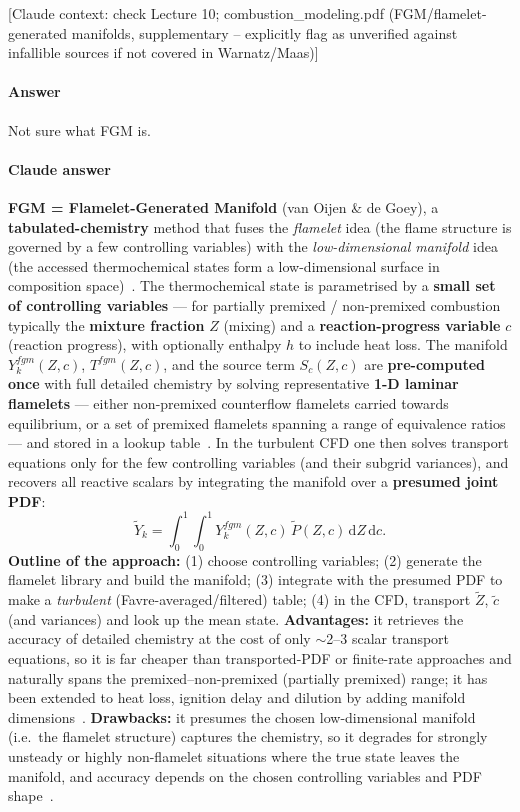 {\color{gray}\footnotesize [Claude context: check Lecture 10; combustion\_modeling.pdf (FGM/flamelet-generated manifolds, supplementary -- explicitly flag as unverified against infallible sources if not covered in Warnatz/Maas)]}

\paragraph{Answer} Not sure what FGM is.


{\color{istblue}
\paragraph{Claude answer}
\textbf{FGM = Flamelet-Generated Manifold} (van Oijen \& de Goey), a \textbf{tabulated-chemistry} method that fuses the \emph{flamelet} idea (the flame structure is governed by a few controlling variables) with the \emph{low-dimensional manifold} idea (the accessed thermochemical states form a low-dimensional surface in composition space)~\cite{vanoijen2000fgm,lecture10}. The thermochemical state is parametrised by a \textbf{small set of controlling variables} --- for partially premixed / non-premixed combustion typically the \textbf{mixture fraction} $Z$ (mixing) and a \textbf{reaction-progress variable} $c$ (reaction progress), with optionally enthalpy $h$ to include heat loss. The manifold $Y_k^{fgm}(Z,c)$, $T^{fgm}(Z,c)$, and the source term $S_c(Z,c)$ are \textbf{pre-computed once} with full detailed chemistry by solving representative \textbf{1-D laminar flamelets} --- either non-premixed counterflow flamelets carried towards equilibrium, or a set of premixed flamelets spanning a range of equivalence ratios --- and stored in a lookup table~\cite{lecture10,vanoijen2000fgm}. In the turbulent CFD one then solves transport equations only for the few controlling variables (and their subgrid variances), and recovers all reactive scalars by integrating the manifold over a \textbf{presumed joint PDF}:
\begin{equation*}
\tilde Y_k = \int_0^1\!\!\int_0^1 Y_k^{fgm}(Z,c)\,\tilde P(Z,c)\,\mathrm{d}Z\,\mathrm{d}c .
\end{equation*}
\textbf{Outline of the approach:} (1) choose controlling variables; (2) generate the flamelet library and build the manifold; (3) integrate with the presumed PDF to make a \emph{turbulent} (Favre-averaged/filtered) table; (4) in the CFD, transport $\tilde Z$, $\tilde c$ (and variances) and look up the mean state. \textbf{Advantages:} it retrieves the accuracy of detailed chemistry at the cost of only $\sim$2--3 scalar transport equations, so it is far cheaper than transported-PDF or finite-rate approaches and naturally spans the premixed--non-premixed (partially premixed) range; it has been extended to heat loss, ignition delay and dilution by adding manifold dimensions~\cite{lecture10,vanoijen2000fgm}. \textbf{Drawbacks:} it presumes the chosen low-dimensional manifold (i.e.\ the flamelet structure) captures the chemistry, so it degrades for strongly unsteady or highly non-flamelet situations where the true state leaves the manifold, and accuracy depends on the chosen controlling variables and PDF shape~\cite{lecture10}.
}
